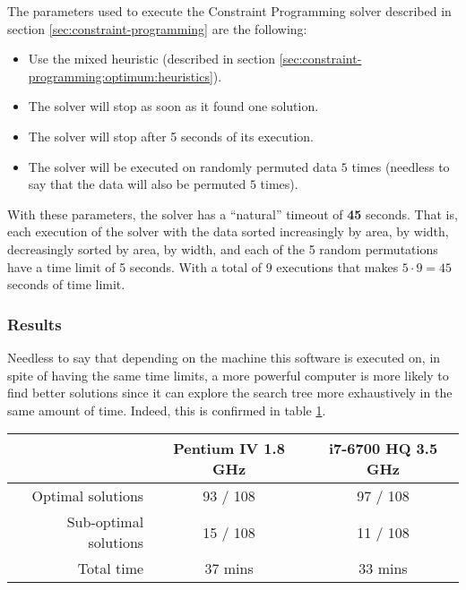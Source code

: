 The parameters used to execute the Constraint Programming solver described in section
\ref{sec:constraint-programming} are the following:
\begin{itemize}
	\item Use the mixed heuristic (described in section \ref{sec:constraint-programming:optimum:heuristics}).
	\item The solver will stop as soon as it found one solution.
	\item The solver will stop after 5 seconds of its execution.
	\item The solver will be executed on randomly permuted data $5$ times (needless to
	say that the data will also be permuted $5$ times).
\end{itemize}

With these parameters, the solver has a ``natural'' timeout of \textbf{45} seconds.
That is, each execution of the solver with the data sorted increasingly by area, by
width, decreasingly sorted by area, by width, and each of the 5 random permutations
have a time limit of 5 seconds. With a total of 9 executions that makes $5 \cdot 9 = 45$
seconds of time limit.

\subsubsection{Results}
\label{sec:benchmarking:constraint-programming:results}

Needless to say that depending on the machine this software is executed on,
in spite of having the same time limits, a more powerful computer is more likely
to find better solutions since it can explore the search tree more exhaustively
in the same amount of time. Indeed, this is confirmed in table \ref{table:CP-results}.

\begin{table}[H]
\centering
	\begin{tabular}{rcc}
								& Pentium IV 1.8 GHz & i7-6700 HQ 3.5 GHz \\
		\midrule
		Optimal solutions		& 93 / 108			 & 97 / 108 \\
		Sub-optimal solutions	& 15 / 108			 & 11 / 108 \\
		Total time				& 37 mins			 & 33 mins \\
	\end{tabular}
	\label{table:CP-results}
\end{table}

